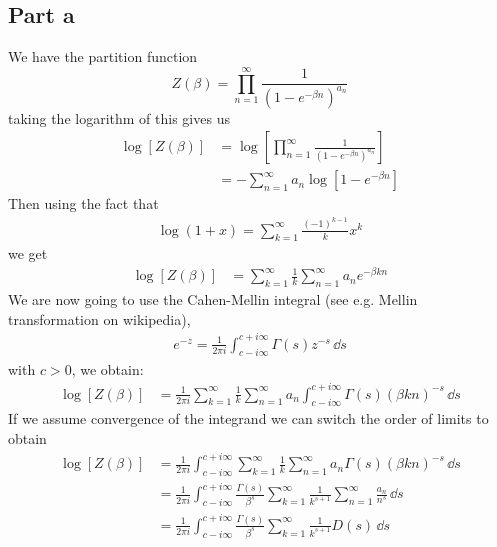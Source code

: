 \documentclass[a4paper,12pt]{article}
\begin{document}
\subsection*{Part a}
We have the partition function
\begin{equation}
Z(\beta)=\prod_{n=1}^{\infty}\frac{1}{\left(1-e^{-\beta n}\right)^{a_n}}
\end{equation}
taking the logarithm of this gives us
\begin{equation}
	\begin{aligned}
		\log [Z(\beta)]&=\log \left[\prod_{n=1}^{\infty}\frac{1}{\left(1-e^{-\beta n}\right)^{a_n}}\right]\\
		&=- \sum_{n=1}^{\infty}a_n\log\left[1-e^{-\beta n}\right]
	\end{aligned}
\end{equation}
Then using the fact that
\begin{equation}
	\begin{aligned}
		\log (1+x)=\sum_{k=1}^{\infty}\frac{(-1)^{k-1}}{k}x^k
	\end{aligned}
\end{equation}
we get
\begin{equation}
	\begin{aligned}
		\log [Z(\beta)]
		&= \sum_{k=1}^{\infty}\frac{1}{k}\sum_{n=1}^{\infty}a_ne^{-\beta kn}
	\end{aligned}
\end{equation}
We are now going to use the Cahen-Mellin integral (see e.g. Mellin transformation on wikipedia), 
\begin{equation}
	\begin{aligned}
		e^{-z}=\frac{1}{2\pi i}\int_{c-i\infty}^{c+i\infty}\Gamma(s)z^{-s}\,\dd s 
	\end{aligned}
\end{equation}
with $c>0$, we obtain:
\begin{equation}
	\begin{aligned}
		\log [Z(\beta)]
&=\frac{1}{2\pi i}\sum_{k=1}^{\infty}\frac{1}{k}\sum_{n=1}^{\infty}a_n \int_{c-i\infty}^{c+i\infty}\Gamma(s)(\beta kn)^{-s}\,\dd s 
	\end{aligned}
\end{equation}
If we assume convergence of the integrand we can switch the order of limits to obtain
\begin{equation}
	\begin{aligned}
		\log [Z(\beta)]
		&=\frac{1}{2\pi i}\int_{c-i\infty}^{c+i\infty}\sum_{k=1}^{\infty}\frac{1}{k}\sum_{n=1}^{\infty}a_n\Gamma(s) (\beta kn)^{-s}\,\dd s \\
			&=\frac{1}{2\pi i}\int_{c-i\infty}^{c+i\infty}\frac{\Gamma(s)}{\beta^s}\sum_{k=1}^{\infty}\frac{1}{k^{s+1}}\sum_{n=1}^{\infty}\frac{a_n}{n^s}\,\dd s \\
					&=\frac{1}{2\pi i}\int_{c-i\infty}^{c+i\infty}\frac{\Gamma(s)}{\beta^s}\sum_{k=1}^{\infty}\frac{1}{k^{s+1}}D(s)\,\dd s 
	\end{aligned}
\end{equation}
\end{document}
